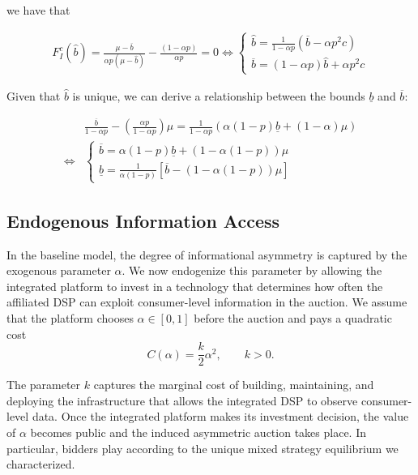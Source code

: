\documentclass[11pt]{article}
\theoremstyle{plain}
\theoremstyle{definition}
\theoremstyle{plain}
\theoremstyle{plain}
\theoremstyle{plain}
\theoremstyle{plain}
\numberwithin{equation}{section}
\begin{document}
\noindent we have that 

\begin{align*}
     F_I^c(\hat{b}) =  \frac{\mu-\overline{b}}{\alpha p(\mu-\hat{b})} - \frac{(1-\alpha p)}{\alpha p} = 0 \iff \begin{cases}
         \hat{b} = \frac{1}{1-\alpha p} \left(\overline{b}-\alpha p^2c\right) \\[5pt]
         \overline{b} = (1-\alpha p)\hat{b} + \alpha p^2 c
     \end{cases}
\end{align*}
\vspace{-0.2mm}

\noindent Given that $\hat{b}$ is unique, we can derive a relationship between the bounds $\underline{b}$ and $\overline{b}$:

\begin{align*}
    & \frac{\overline{b}}{1-\alpha p}-\left(\frac{\alpha p}{1-\alpha p}\right)\mu = \frac{1}{1-\alpha p}\left(\alpha(1-p)\underline{b}  + (1-\alpha)\mu \right) \\[5pt]
    \iff & \begin{cases}
        \overline{b} = 
        \alpha(1-p) \underline{b} + \left(1-\alpha(1-p) \right)\mu \\[5pt]
        \underline{b} = \frac{1}{\alpha(1-p)} \left[ \overline{b} - \left(1-\alpha(1-p) \right)\mu\right]
    \end{cases}
\end{align*}

\fi
 
\newpage
\subsection{Endogenous Information Access}

In the baseline model, the degree of informational asymmetry is captured by the exogenous
parameter $\alpha$. We now endogenize this parameter by allowing the integrated platform to invest in a technology that determines how often the affiliated DSP can exploit consumer-level information in the auction. We assume that the platform chooses $ \alpha \in [0,1] $ before the auction and pays a quadratic cost
\[
C(\alpha) = \frac{k}{2}\alpha^2, \qquad k > 0.
\]

\vspace{0.2cm}

\noindent The parameter $k$ captures the marginal cost of building, maintaining, and deploying the infrastructure that allows the integrated DSP to observe consumer-level data. Once the integrated platform makes its investment decision, the value of $ \alpha $ becomes public and the induced asymmetric auction takes place. In particular, bidders play according to the unique mixed strategy equilibrium we characterized.
\end{document}
